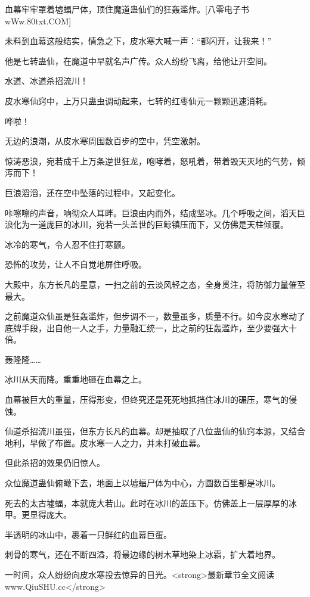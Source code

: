 
\begin{this_body}

血幕牢牢罩着墟蝠尸体，顶住魔道蛊仙们的狂轰滥炸。[八零电子书wWw.80txt.COM]

未料到血幕这般结实，情急之下，皮水寒大喊一声：“都闪开，让我来！”

他是七转蛊仙，在魔道中早就名声广传。众人纷纷飞离，给他让开空间。

水道、冰道杀招流川！

皮水寒仙窍中，上万只蛊虫调动起来，七转的红枣仙元一颗颗迅速消耗。

哗啦！

无边的浪潮，从皮水寒周围数百步的空中，凭空激射。

惊涛恶浪，宛若成千上万条逆世狂龙，咆哮着，怒吼着，带着毁天灭地的气势，倾泻而下！

巨浪滔滔，还在空中坠落的过程中，又起变化。

咔嚓嚓的声音，响彻众人耳畔。巨浪由内而外，结成坚冰。几个呼吸之间，滔天巨浪化为一道庞巨的冰川，宛若一头盖世的巨鲸镇压而下，又仿佛是天柱倾覆。

冰冷的寒气，令人忍不住打寒颤。

恐怖的攻势，让人不自觉地屏住呼吸。

大殿中，东方长凡的星意，一扫之前的云淡风轻之态，全身贯注，将防御力量催至最大。

之前魔道众仙虽是狂轰滥炸，但步调不一，数量虽多，质量不行。如今皮水寒动了底牌手段，出自他一人之手，力量融汇统一，比之前的狂轰滥炸，至少要强大十倍。

轰隆隆……

冰川从天而降。重重地砸在血幕之上。

血幕被巨大的重量，压得形变，但终究还是死死地抵挡住冰川的碾压，寒气的侵蚀。

仙道杀招流川虽强，但东方长凡的血幕。却是抽取了八位蛊仙的仙窍本源，又结合地利，早做了布置。皮水寒一人之力，并未打破血幕。

但此杀招的效果仍旧惊人。

众位魔道蛊仙俯瞰下去，地面上以墟蝠尸体为中心，方圆数百里都是冰川。

死去的太古墟蝠，本就庞大若山。此时在冰川的盖压下。仿佛盖上一层厚厚的冰甲。更显得庞大。

半透明的冰山中，裹着一只鲜红的血幕巨蛋。

刺骨的寒气，还在不断四溢，将最边缘的树木草地染上冰霜，扩大着地界。

一时间，众人纷纷向皮水寒投去惊异的目光。<strong>最新章节全文阅读www.QiuSHU.cc</strong>


\end{this_body}
